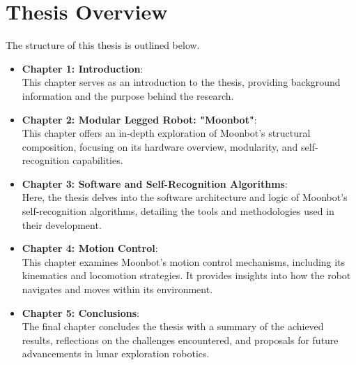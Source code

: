 \section{Thesis Overview}
The structure of this thesis is outlined below. 

\begin{itemize}
    \item \textbf{Chapter 1: Introduction}: \\
    This chapter serves as an introduction to the thesis, providing background information and the purpose behind the research.
   
    \item \textbf{Chapter 2: Modular Legged Robot: "Moonbot"}: \\
    This chapter offers an in-depth exploration of Moonbot's structural composition, focusing on its hardware overview, modularity, and self-recognition capabilities.

    \item \textbf{Chapter 3: Software and Self-Recognition Algorithms}: \\
    Here, the thesis delves into the software architecture and logic of Moonbot's self-recognition algorithms, detailing the tools and methodologies used in their development.

    \item \textbf{Chapter 4: Motion Control}: \\
    This chapter examines Moonbot's motion control mechanisms, including its kinematics and locomotion strategies. It provides insights into how the robot navigates and moves within its environment.

    \item \textbf{Chapter 5: Conclusions}: \\
    The final chapter concludes the thesis with a summary of the achieved results, reflections on the challenges encountered, and proposals for future advancements in lunar exploration robotics.
\end{itemize}


